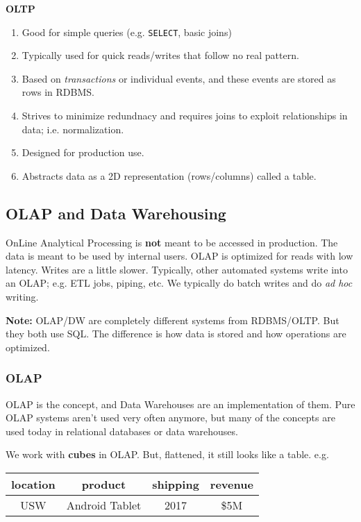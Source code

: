 \documentclass{report}
\renewcommand{\bf}[1]{\textbf{{#1}}}
\renewcommand{\tt}[1]{\texttt{{#1}}}
\renewcommand{\it}[1]{\textit{{#1}}}
\begin{document}
\bf{OLTP}
\begin{enumerate}
    \item Good for simple queries (e.g. \tt{SELECT}, basic joins)
    \item Typically used for quick reads/writes that follow no real pattern.
    \item Based on \it{transactions} or individual events, and these events are stored as rows in
        RDBMS.
    \item Strives to minimize redundnacy and requires joins to exploit relationships in data; i.e.
        normalization.
    \item Designed for production use.
    \item Abstracts data as a 2D representation (rows/columns) called a table.
\end{enumerate}

\subsection{OLAP and Data Warehousing}
OnLine Analytical Processing is \bf{not} meant to be accessed in production. The data is meant to be
used by internal users. OLAP is optimized for reads with low latency. Writes are a little slower.
Typically, other automated systems write into an OLAP; e.g. ETL jobs, piping, etc.
We typically do batch writes and do \it{ad hoc} writing.
\vspace{1em}

\bf{Note:} OLAP/DW are completely different systems from RDBMS/OLTP. But they both use SQL. The
difference is how data is stored and how operations are optimized.

\subsubsection{OLAP}
OLAP is the concept, and Data Warehouses are an implementation of them. Pure OLAP systems aren't
used very often anymore, but many of the concepts are used today in relational databases or data
warehouses. 

We work with \bf{cubes} in OLAP. But, flattened, it still looks like a table. e.g.
\begin{center}
\begin{tabular}{c|c|c|c}
    location & product & shipping & revenue \\
    \hline
    USW & Android Tablet & 2017 & \$5M
\end{tabular}
\end{center}
\end{document}
